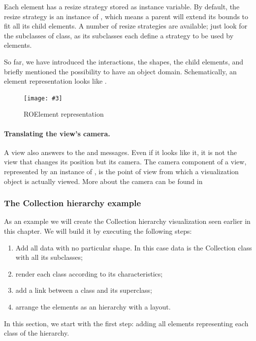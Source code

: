 \documentclass[a4paper,10pt,twoside]{book}
\newcommand{\fig}[4]{
		\begin{figure}[#1]
			\centering
			\texttt{[image: \#3]}
			\caption{\label{fig:#3}#4}
		\end{figure}}
\begin{document}
Each element has a resize strategy stored as  instance variable.
By default, the resize strategy is an instance of , which means a parent will extend its bounds to fit all its child elements. A number of resize strategies are available; just look for the subclasses of  class, as its subclasses each define a strategy to be used by elements.

So far, we have introduced the interactions, the shapes, the child elements, and briefly mentioned the possibility to have an object domain. Schematically, an element representation looks like .

\fig{H}{0.5}{ROElementModel}{ROElement representation}

\paragraph{Translating the view's camera.}
A view also answers to the  and  messages. Even if it looks like it, it is not the view that changes its position but its camera. The camera component of a view, represented by an instance of , is the point of view from which a visualization object is actually viewed. More about the camera can be found in 

\subsubsection{The Collection hierarchy example}

As an example we will create the Collection hierarchy visualization seen earlier in this chapter. We will build it by executing the following steps:
\begin{enumerate}
\item Add all data with no particular shape. In this case data is the Collection class with all its subclasses;
\item render each class according to its characteristics;
\item add a link between a class and its superclass;
\item arrange the elements as an hierarchy with a layout.
\end{enumerate}

In this section, we start with the first step: adding all elements representing each class of the hierarchy. 
\end{document}
